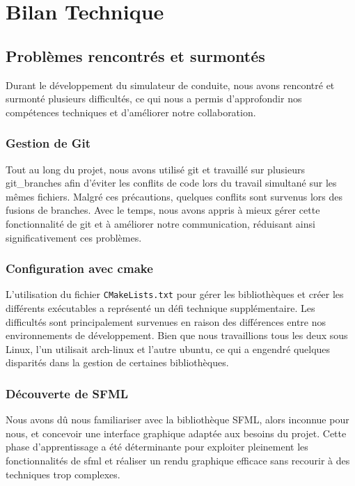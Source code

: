 \section{Bilan Technique}\label{sec:bilan-technique}

\subsection{Problèmes rencontrés et surmontés}\label{subsec:problemes-rencontres-et-surmontes}
Durant le développement du simulateur de conduite, nous avons rencontré et surmonté plusieurs difficultés, ce qui nous a permis d'approfondir nos compétences techniques et d'améliorer notre collaboration.

\subsubsection{Gestion de Git}\label{subsubsec:git}
Tout au long du projet, nous avons utilisé \gls{git} et travaillé sur plusieurs \gls{git_branches} afin d'éviter les conflits de code lors du travail simultané sur les mêmes fichiers.
Malgré ces précautions, quelques conflits sont survenus lors des fusions de branches.
Avec le temps, nous avons appris à mieux gérer cette fonctionnalité de \gls{git} et à améliorer notre communication, réduisant ainsi significativement ces problèmes.

\subsubsection{Configuration avec \gls{cmake}}\label{subsubsec:cmake}
L'utilisation du fichier \texttt{CMakeLists.txt} pour gérer les bibliothèques et créer les différents exécutables a représenté un défi technique supplémentaire.
Les difficultés sont principalement survenues en raison des différences entre nos environnements de développement.
Bien que nous travaillions tous les deux sous Linux, l'un utilisait \gls{arch-linux} et l'autre \gls{ubuntu}, ce qui a engendré quelques disparités dans la gestion de certaines bibliothèques.

\subsubsection{Découverte de SFML}\label{subsubsec:SFML}
Nous avons dû nous familiariser avec la bibliothèque SFML, alors inconnue pour nous, et concevoir une interface graphique adaptée aux besoins du projet.
Cette phase d'apprentissage a été déterminante pour exploiter pleinement les fonctionnalités de \gls{sfml} et réaliser un rendu graphique efficace sans recourir à des techniques trop complexes.

